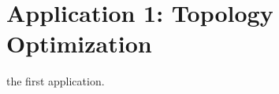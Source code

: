 
\chapter{Application 1: Topology Optimization}

the first application.
\blindtext{}






\cleardoublepage
